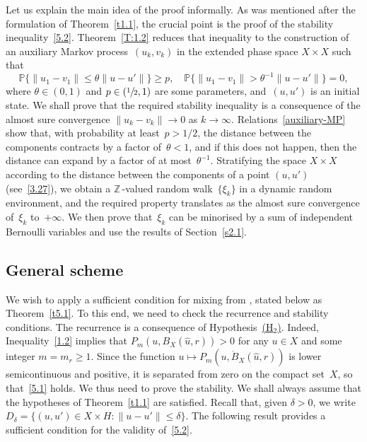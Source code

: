 \documentclass[11pt]{article}
\theoremstyle{plain}
\theoremstyle{definition}
\theoremstyle{plain}
\numberwithin{equation}{section}
\newcommand{\Z}{{\mathbb Z}}
\newcommand{\IP}{{\mathbb P}}
\begin{document}
Let us explain the main idea of the proof informally. As was mentioned after the formulation of Theorem~\ref{t1.1}, the crucial point is the proof of the stability inequality~\eqref{5.2}. Theorem~\ref{T:1.2} reduces that inequality to the construction of an auxiliary Markov process~$(u_k,v_k)$ in the extended phase space $X\times X$ such that\vspace*{-3pt}
\begin{equation} \label{auxiliary-MP}
\IP\{\|u_1-v_1\|\le \theta\|u-u'\|\}\ge p,\quad \IP\{\|u_1-v_1\|> \theta^{-1}\|u-u'\|\}=0,
\end{equation}
where $\theta\in(0,1)$ and $p\in(\sfrac12,1)$ are some parameters, and~$(u,u')$ is an initial state. We shall prove that the required stability inequality is a consequence of the almost sure convergence $\|u_k-v_k\|\to0$ as $k\to\infty$. Relations~\eqref{auxiliary-MP} show that, with probability at least~$p>1/2$, the distance between the components contracts by a factor of~$\theta<1$, and if this does not happen, then the distance can expand by a factor of at most~$\theta^{-1}$. Stratifying the space $X\times X$ according to the distance between the components of a point $(u,u')$ (see~\eqref{3.27}), we obtain a $\Z\,$-valued random walk~$\{\xi_k\}$ in a dynamic random environment, and the required property translates as the almost sure convergence of~$\xi_k$ to~$+\infty$. We then prove that~$\xi_k$ can be minorised by a sum of independent Bernoulli variables and use the results of Section~\ref{s2.1}.

\subsection{General scheme}
\label{s3.1}
We wish to apply a sufficient condition for mixing from \cite[\S 3.1.2]{KS-book}, stated below as Theorem~\ref{t5.1}. To this end, we need to check the recurrence and stability conditions. The recurrence is a consequence of Hypothesis~\hyperlink{H1}{(H$_2$)}. \hbox{Indeed}, Inequality~\eqref{1.2} implies that $P_m(u,B_X(\hat u,r))>0$ for any $u\in X$ and some integer $m=m_r\ge1$. Since the function $u\mapsto P_m(u,\dot B_X(\hat u,r))$ is lower semicontinuous and positive, it is separated from zero on the compact set~$X$, so that~\eqref{5.1} holds. We thus need to prove the stability. We shall always assume that the hypotheses of Theorem~\ref{t1.1} are satisfied. Recall that, given $\delta>0$, we write $D_\delta=\{(u,u')\in X\times H:\|u-u'\|\le\delta\}$. The following result provides a sufficient condition for the validity of~\eqref{5.2}.
\end{document}
